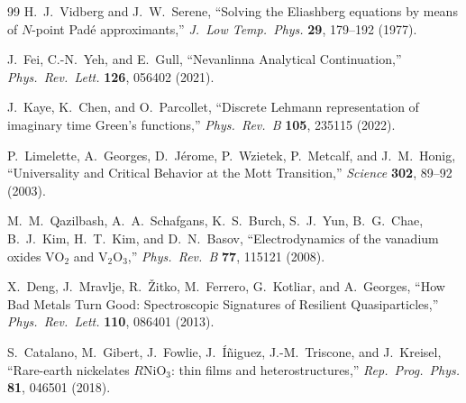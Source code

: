 \documentclass[11pt,a4paper]{article}
\numberwithin{equation}{section}
\theoremstyle{plain}
\theoremstyle{definition}
\begin{document}
\begin{thebibliography}{99}
H.~J.~Vidberg and J.~W.~Serene,
``Solving the Eliashberg equations by means of $N$-point Pad\'e approximants,''
\textit{J.\ Low Temp.\ Phys.} \textbf{29}, 179--192 (1977).

J.~Fei, C.-N.~Yeh, and E.~Gull,
``Nevanlinna Analytical Continuation,''
\textit{Phys.\ Rev.\ Lett.} \textbf{126}, 056402 (2021).

J.~Kaye, K.~Chen, and O.~Parcollet,
``Discrete Lehmann representation of imaginary time Green's functions,''
\textit{Phys.\ Rev.\ B} \textbf{105}, 235115 (2022).

P.~Limelette, A.~Georges, D.~J\'erome, P.~Wzietek, P.~Metcalf, and J.~M.~Honig,
``Universality and Critical Behavior at the Mott Transition,''
\textit{Science} \textbf{302}, 89--92 (2003).

M.~M.~Qazilbash, A.~A.~Schafgans, K.~S.~Burch, S.~J.~Yun, B.~G.~Chae, B.~J.~Kim, H.~T.~Kim, and D.~N.~Basov,
``Electrodynamics of the vanadium oxides $\mathrm{VO}_2$ and $\mathrm{V}_2\mathrm{O}_3$,''
\textit{Phys.\ Rev.\ B} \textbf{77}, 115121 (2008).

X.~Deng, J.~Mravlje, R.~\v{Z}itko, M.~Ferrero, G.~Kotliar, and A.~Georges,
``How Bad Metals Turn Good: Spectroscopic Signatures of Resilient Quasiparticles,''
\textit{Phys.\ Rev.\ Lett.} \textbf{110}, 086401 (2013).

S.~Catalano, M.~Gibert, J.~Fowlie, J.~\'I\~niguez, J.-M.~Triscone, and J.~Kreisel,
``Rare-earth nickelates $R\mathrm{NiO}_3$: thin films and heterostructures,''
\textit{Rep.\ Prog.\ Phys.} \textbf{81}, 046501 (2018).

\end{thebibliography}
\end{document}
